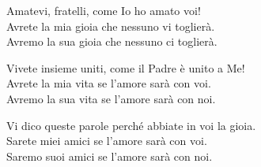 
\strofa Amatevi, fratelli, come Io ho amato voi!\\
Avrete la mia gioia che nessuno vi toglierà.\\
Avremo la sua gioia che nessuno ci toglierà.

\spazio

\strofa Vivete insieme uniti, come il Padre è unito a Me!\\
Avrete la mia vita se l'amore sarà con voi.\\
Avremo la sua vita se l'amore sarà con noi.

\spazio

\strofa Vi dico queste parole perché abbiate in voi la gioia.\\
Sarete miei amici se l'amore sarà con voi.\\
Saremo suoi amici se l'amore sarà con noi.
